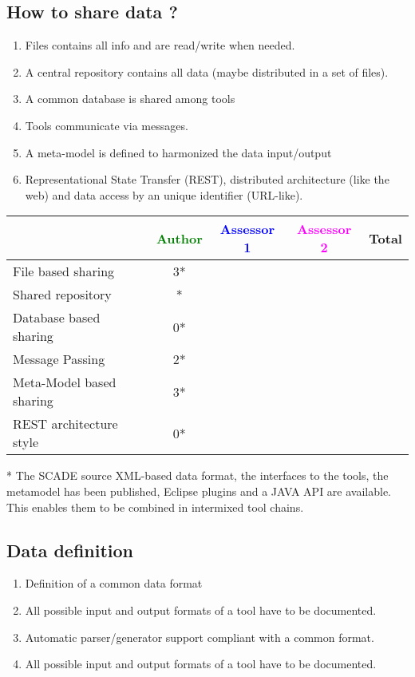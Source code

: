 \subsection{How to share data ?}
\begin{enumerate}
\item Files contains all info and are read/write when needed.
\item A central repository contains all data (maybe distributed in a
  set of files).
\item A common database is shared among tools
\item Tools communicate via messages.
\item A meta-model is defined to harmonized the data input/output
\item Representational State Transfer (REST), distributed architecture (like the web) and data access by an
  unique identifier (URL-like).
\end{enumerate}
\begin{tabular}{|l | c | c | c | c|} \hline
  & \textcolor{green}{Author} & \textcolor{blue}{Assessor 1} &  \textcolor{magenta}{Assessor 2} & Total \\
  \hline File based sharing & 3*
  &                 &                  &\\
  \hline Shared repository &*
  &                 &                  &\\
  \hline Database based sharing& 0*
  &                 &                  &\\
  \hline Message Passing& 2*
  &                 &                  &\\
  \hline Meta-Model based sharing & 3*
  &                 &                  &\\
  \hline REST architecture style & 0*
  &                 &                  &\\
  \hline
\end{tabular}

\begin{author_comment}
* The SCADE source XML-based data format, the interfaces to the tools, the metamodel has been published, Eclipse plugins and a JAVA API are available. This enables them to be combined in intermixed tool chains. 
\end{author_comment}


\subsection{Data definition}
\begin{enumerate}
\item Definition of a common data format
\item All possible input and output formats of a tool have to be
  documented.
\item Automatic parser/generator support compliant with a common format.
\item All possible input and output formats of a tool have to be documented.
\end{enumerate}

